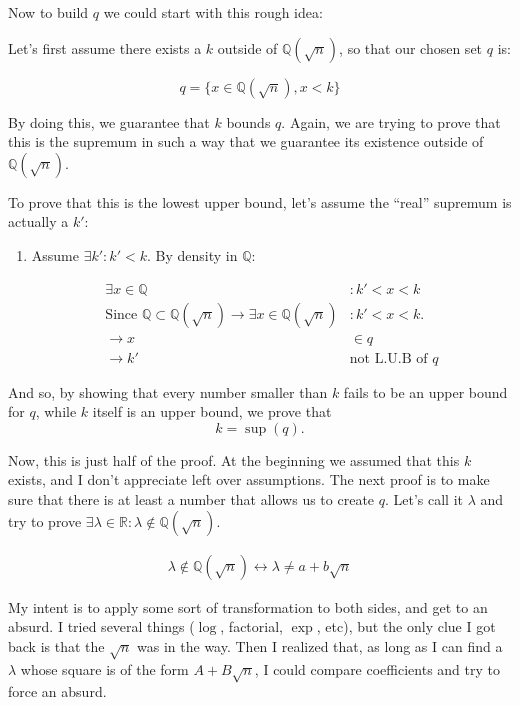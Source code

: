 \begin{solution}
Now to build $q$ we could start with this rough idea:



Let's first assume there exists a $k$ outside of $\mathbb{Q}(\sqrt{n})$, so that our chosen set $q$ is:

$$q = \{x \in \mathbb{Q}(\sqrt{n}), x < k\}$$

By doing this, we guarantee that $k$ bounds $q$. Again, we are trying to prove that this is the supremum in such a way that we guarantee its existence outside of $\mathbb{Q}(\sqrt{n})$.

To prove that this is the lowest upper bound, let's assume the ``real'' supremum is actually a $k'$:

\begin{enumerate}[label=\roman*)]
\item Assume $\exists k': k' < k$. By density in $\mathbb{Q}:$

\begin{align*}
\exists x \in \mathbb{Q}&: k' < x < k \\
\text{Since } \mathbb{Q} \subset \mathbb{Q}(\sqrt{n}) \rightarrow \exists x \in \mathbb{Q}(\sqrt{n})&: k' < x < k. \\
\rightarrow x &\in q \\
\rightarrow k' &\text{not L.U.B of } q
\end{align*}

\end{enumerate}

And so, by showing that every number smaller than $k$ fails to be an upper bound for $q$, while $k$ itself is an upper bound, we prove that
$$k = \sup(q).$$

Now, this is just half of the proof. At the beginning we assumed that this $k$ exists, and I don't appreciate left over assumptions. The next proof is to make sure that there is at least a number that allows us to create $q$. Let's call it $\lambda$ and try to prove $\exists \lambda \in \mathbb{R}: \lambda \not\in \mathbb{Q}(\sqrt{n})$.

\begin{align*}
\lambda \not\in \mathbb{Q}(\sqrt{n}) \leftrightarrow \lambda \not= a + b\sqrt{n}
\end{align*}

My intent is to apply some sort of transformation to both sides, and get to an absurd. I tried several things ($\log$, factorial, $\exp$, etc), but the only clue I got back is that the $\sqrt{n}$ was in the way. Then I realized that, as long as I can find a $\lambda$ whose square is of the form $A+B\sqrt{n}$, I could compare coefficients and try to force an absurd.


\end{solution}
